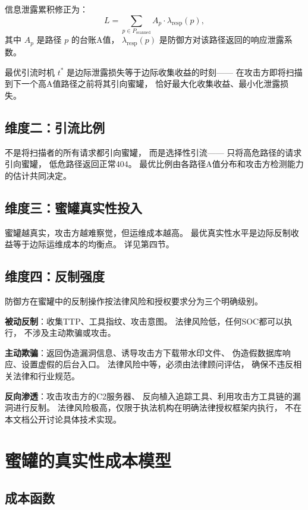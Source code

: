 \documentclass[11pt,a4paper]{article}
\begin{document}
信息泄露累积修正为：
\[
L = \sum_{p \in P_{\text{scanned}}} A_p \cdot \lambda_{\text{resp}}(p),
\]
其中 $A_p$ 是路径 $p$ 的台账A值，
$\lambda_{\text{resp}}(p)$ 是防御方对该路径返回的响应泄露系数。

最优引流时机 $t^*$ 是边际泄露损失等于边际收集收益的时刻——
在攻击方即将扫描到下一个高A值路径之前将其引向蜜罐，
恰好最大化收集收益、最小化泄露损失。

\subsection{维度二：引流比例}

不是将扫描者的所有请求都引向蜜罐，
而是选择性引流——
只将高危路径的请求引向蜜罐，
低危路径返回正常404。
最优比例由各路径A值分布和攻击方检测能力的估计共同决定。

\subsection{维度三：蜜罐真实性投入}

蜜罐越真实，攻击方越难察觉，但运维成本越高。
最优真实性水平是边际反制收益等于边际运维成本的均衡点。
详见第四节。

\subsection{维度四：反制强度}

防御方在蜜罐中的反制操作按法律风险和授权要求分为三个明确级别。

\textbf{被动反制}：收集TTP、工具指纹、攻击意图。
法律风险低，任何SOC都可以执行，
不涉及主动欺骗或攻击。

\textbf{主动欺骗}：返回伪造漏洞信息、诱导攻击方下载带水印文件、
伪造假数据库响应、设置虚假的后台入口。
法律风险中等，必须由法律顾问评估，
确保不违反相关法律和行业规范。

\textbf{反向渗透}：攻击攻击方的C2服务器、
反向植入追踪工具、利用攻击方工具链的漏洞进行反制。
法律风险极高，仅限于执法机构在明确法律授权框架内执行，
不在本文档公开讨论具体技术实现。

\section{蜜罐的真实性成本模型}

\subsection{成本函数}
\end{document}
